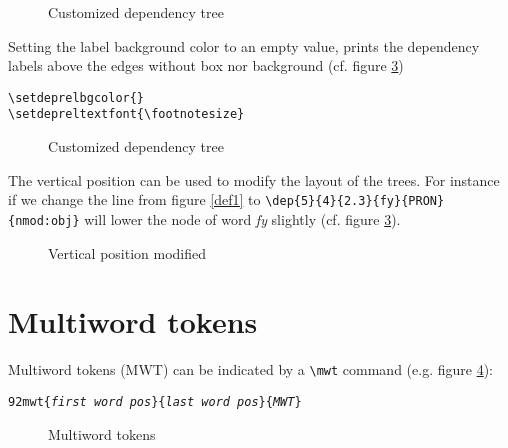 \documentclass[12pt]{article}
\begin{document}
\begin{figure}[H]
\beispiel
\caption{Customized dependency tree}\label{ex2}
\end{figure}


Setting the label background color to an empty value, prints the dependency labels
above the edges without box nor background (cf. figure \ref{ex3})

\begin{verbatim}
\setdeprelbgcolor{}
\setdepreltextfont{\footnotesize}
\end{verbatim}


\setdeprelbgcolor{}
\setdepreltextfont{\footnotesize}
\begin{figure}[H]
\beispielNOPOS
\caption{Customized dependency tree}\label{ex3}
\end{figure}

The vertical position can be used to modify the layout of the
trees. For instance if we change the line from figure \ref{def1}
to \verb+\dep{5}{4}{2.3}{fy}{PRON}{nmod:obj}+
 will lower the node of
word \emph{fy} slightly (cf. figure \ref{ex3}).


\begin{figure}[H]
\caption{Vertical position modified}\label{ex3}
\end{figure}


\section{Multiword tokens}
Multiword tokens (MWT) can be indicated by a \verb:\mwt: command
(e.g. figure \ref{ex4}):

 {\tt\char92mwt\{\emph{first word pos}\}\{\emph{last word
     pos}\}\{\emph{MWT}\}} 



\begin{figure}[H]
\caption{Multiword tokens}\label{ex4}
\end{figure}
\end{document}
